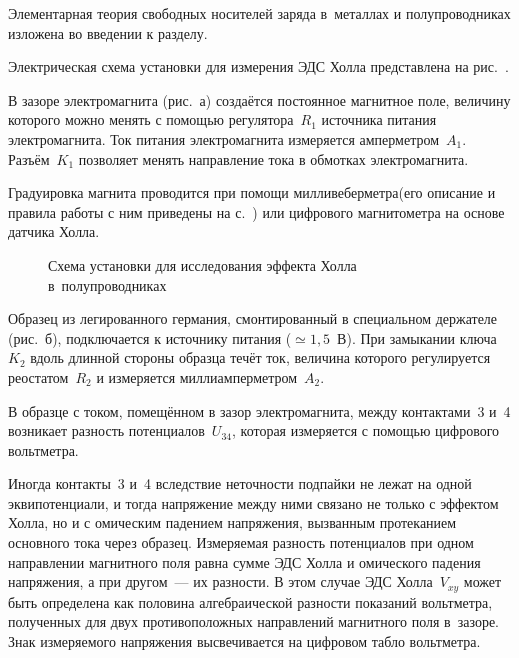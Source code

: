 


Элементарная теория свободных носителей заряда в~металлах и полупроводниках
изложена во введении к разделу.


\experiment
Электрическая схема установки для измерения ЭДС Холла представлена
на рис.~.

В зазоре электромагнита (рис.~а) создаётся постоянное магнитное
поле, величину которого можно менять с помощью регулятора~$R_1$ источника
питания электромагнита. Ток питания электромагнита измеряется амперметром~$A_1$.
Разъём~$K_1$ позволяет менять направление тока в обмотках электромагнита.

Градуировка магнита проводится при помощи милливеберметра(его описание и правила
работы с ним приведены на с.~\pageref{MWB}) или цифрового магнитометра на основе
датчика Холла.
\begin{figure}[h!]
	\caption{Схема установки для исследования эффекта Холла в~полупроводниках}
\end{figure}

Образец из легированного германия, смонтированный в специальном держателе
(рис.~б), подключается к источнику питания ($\simeq 1,5$~В). При
замыкании ключа~$K_2$ вдоль длинной стороны образца течёт ток, величина которого
регулируется реостатом~$R_2$ и измеряется миллиамперметром~$A_2$.

В образце с током, помещённом в зазор электромагнита, между контактами~3 и~4
возникает разность потенциалов~$U_{34}$, которая измеряется с помощью цифрового
вольтметра.

Иногда контакты~3 и~4 вследствие неточности подпайки не лежат на одной
эквипотенциали, и тогда напряжение между ними связано не только с эффектом
Холла, но и с омическим падением напряжения, вызванным протеканием основного
тока  через образец. Измеряемая разность потенциалов при одном направлении
магнитного поля равна сумме ЭДС Холла и омического падения напряжения, а при
другом~--- их разности. В этом случае ЭДС Холла~$V_{xy}$ может быть определена
как половина алгебраической разности показаний вольтметра, полученных для двух
противоположных направлений магнитного поля в~зазоре. Знак измеряемого
напряжения высвечивается на цифровом табло вольтметра.

